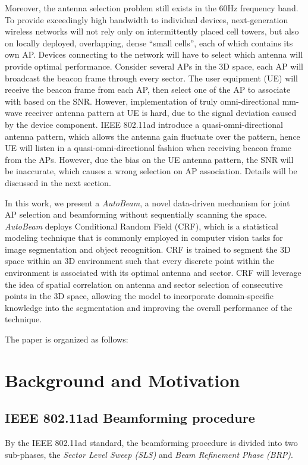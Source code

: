 \documentclass[conference]{IEEEtran}
\begin{document}
Moreover, the antenna selection problem still exists in the 60Hz frequency band. To provide exceedingly high bandwidth to individual devices, next-generation wireless networks will not rely only on intermittently placed cell towers, but also on locally deployed, overlapping, dense “small cells”, each of which contains its own AP. Devices connecting to the network will have to select which antenna will provide optimal performance. Consider several APs in the 3D space, each AP will broadcast the beacon frame through every sector. The user equipment (UE) will receive the beacon frame from each AP, then select one of the AP to associate with based on the SNR. However, implementation of truly omni-directional mm-wave receiver antenna pattern at UE is hard, due to the signal deviation caused by the device component. IEEE 802.11ad introduce a quasi-omni-directional antenna pattern, which allows the antenna gain fluctuate over the pattern, hence UE will listen in a quasi-omni-directional fashion when receiving beacon frame from the APs. However, due the bias on the UE antenna pattern, the SNR will be inaccurate, which causes a wrong selection on AP association. Details will be discussed in the next section.

In this work, we present a \emph{AutoBeam}, a novel data-driven mechanism for joint AP selection and beamforming without sequentially scanning the space. \emph{AutoBeam} deploys Conditional Random Field (CRF),  which is a statistical modeling technique that is commonly employed in computer vision tasks for image segmentation and object recognition. CRF is trained to segment the 3D space within an 3D environment such that every discrete point within the environment is associated with its optimal antenna and sector. CRF will leverage the idea of spatial correlation on antenna and sector selection of consecutive points in the 3D space, allowing the model to incorporate domain-specific knowledge into the segmentation and improving the overall performance of the technique.

The paper is organized as follows:





\section{Background and Motivation}
\subsection{IEEE 802.11ad Beamforming procedure}
By the IEEE 802.11ad standard, the beamforming procedure is divided into two sub-phases, the \emph{Sector Level Sweep (SLS)} and \emph{Beam Refinement Phase (BRP)}. 
\end{document}
